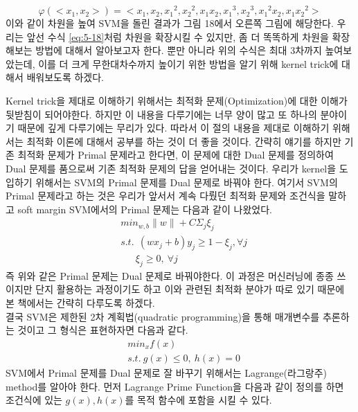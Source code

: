 \documentclass[a4paper]{oblivoir}
\begin{document}
\begin{equation}
\varphi(<x_1,x_2>)=<x_1,x_2,{x_1}^2,{x_2}^2,x_1x_2,{x_1}^3,{x_2}^3,{x_1}^2 x_2,x_1{x_2}^2>
\label{eq:5-18}
\end{equation}
\indent 이와 같이 차원을 높여 SVM을 돌린 결과가 그림 18에서 오른쪽 그림에 해당한다. 우리는 앞선 수식 \eqref{eq:5-18}처럼 차원을 확장시킬 수 있지만, 좀 더 똑똑하게 차원을 확장해보는 방법에 대해서 알아보고자 한다. 뿐만 아니라 위의 수식은 최대 3차까지 높여보았는데, 이를 더 크게 무한대차수까지 높이기 위한 방법을 알기 위해 kernel trick에 대해서 배워보도록 하겠다.

\indent Kernel trick을 제대로 이해하기 위해서는 최적화 문제(Optimization)에 대한 이해가 뒷받침이 되어야한다. 하지만 이 내용을 다루기에는 너무 양이 많고 또 하나의 분야이기 때문에 깊게 다루기에는 무리가 있다. 따라서 이 절의 내용을 제대로 이해하기 위해서는 최적화 이론에 대해서 공부를 하는 것이 더 좋을 것이다. 간략히 얘기를 하지만 기존 최적화 문제가 Primal 문제라고 한다면, 이 문제에 대한 Dual 문제를 정의하여 Dual 문제를 품으로써 기존 최적화 문제의 답을 얻어내는 것이다. 우리가 kernel을 도입하기 위해서는 SVM의 Primal 문제를 Dual 문제로 바꿔야 한다. 여기서 SVM의 Primal 문제라고 하는 것은 우리가 앞서서 계속 다뤘던 최적화 문제와 조건식을 말하고 soft margin SVM에서의 Primal 문제는 다음과 같이 나왔었다.
\begin{equation}
\begin{split}
&min_{w,b} {\lVert w\rVert}+C\Sigma_{j} \xi_j\\
&s.t.\ \ (wx_j+b)y_j\geq 1-\xi_j, \forall j\\
&\ \ \ \ \ \ \ \xi_j\geq 0,\ \forall j
\end{split}
\label{eq:5-20}
\end{equation}
\indent 즉 위와 같은 Primal 문제는 Dual 문제로 바꿔야한다. 이 과정은 머신러닝에 종종 쓰이지만 단지 활용하는 과정이기도 하고 이와 관련된 최적화 분야가 따로 있기 때문에 본 책에서는 간략히 다루도록 하겠다.\\
\indent 결국 SVM은 제한된 2차 계획법(quadratic programming)을 통해 매개변수를 추론하는 것이고 그 형식은 표현하자면 다음과 같다.
\begin{equation}
\begin{split}
&min_{x} f(x)\\
&s.t.\ g(x)\leq 0,\ h(x)=0
\end{split}
\label{eq:5-21}
\end{equation}
\indent SVM에서 Primal 문제를 Dual 문제로 잘 바꾸기 위해서는 Lagrange(라그랑주) method를 알아야 한다. 먼저 Lagrange Prime Function을 다음과 같이 정의를 하면 조건식에 있는 $g(x),h(x)$를 목적 함수에 포함을 시킬 수 있다.
\end{document}
